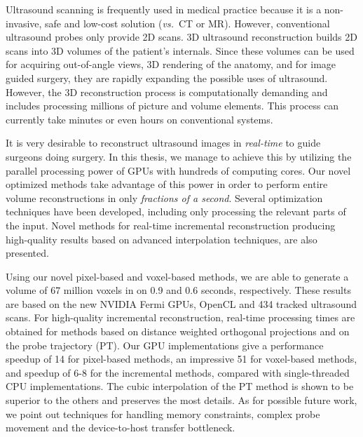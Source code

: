 
Ultrasound scanning is frequently used in medical practice because it is a non-invasive, safe and low-cost solution (\textit{vs.}\ CT or MR). However, conventional ultrasound probes only provide 2D scans. 3D ultrasound reconstruction builds 2D scans into 3D volumes of the patient's internals. Since these volumes can be used for acquiring out-of-angle views, 3D rendering of the anatomy, and for image guided surgery, they are rapidly expanding the possible uses of ultrasound. However, the 3D reconstruction process is computationally demanding and includes processing millions of picture and volume elements. This process can currently take minutes or even hours on conventional systems. 

It is very desirable to reconstruct ultrasound images in \emph{real-time} to guide surgeons doing surgery. In this thesis, we manage to achieve this by utilizing the parallel processing power of GPUs with hundreds of computing cores. Our novel optimized methods take advantage of this power in order to perform entire volume reconstructions in only \emph{fractions of a second}. Several optimization techniques have been developed, including only processing the relevant parts of the input. Novel methods for real-time incremental reconstruction producing high-quality results based on advanced interpolation techniques, are also presented. 

Using our novel pixel-based and voxel-based methods, we are able to generate a volume of 67 million voxels in on 0.9 and 0.6 seconds, respectively. These results are based on the new NVIDIA Fermi GPUs, OpenCL and 434 tracked ultrasound scans. For high-quality incremental reconstruction, real-time processing times are obtained for methods based on distance weighted orthogonal projections and on the probe trajectory (PT). Our GPU implementations give a performance speedup of 14 for pixel-based methods, an impressive 51 for voxel-based methods, and speedup of 6-8 for the incremental methods, compared with single-threaded CPU implementations. The cubic interpolation of the PT method is shown to be superior to the others and preserves the most details. As for possible future work, we point out techniques for handling memory constraints, complex probe movement and the device-to-host transfer bottleneck.